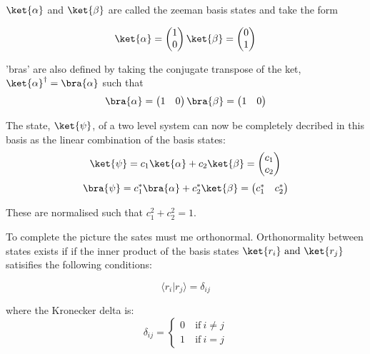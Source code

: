 $\ket{\alpha}$ and $\ket{\beta}$ are called the zeeman basis states and take the form

\begin{equation}
  \ket{\alpha} = \begin{pmatrix}
    1\\
    0
\end{pmatrix}
 \ket{\beta} = \begin{pmatrix}
   0\\
   1
\end{pmatrix}
\end{equation}

'bras' are also defined by taking the conjugate transpose of the ket, $\ket{\alpha}^{\dagger} =
\bra{\alpha}$ such that
\begin{equation}
  \bra{\alpha} = \begin{pmatrix}
    1 & 0
\end{pmatrix}
  \bra{\beta} = \begin{pmatrix}
  1 & 0
\end{pmatrix}
\end{equation}

The state, $\ket{\psi}$, of a two level system can now be completely decribed in this basis
as the linear combination of the basis states:
\begin{equation}\label{eqn:zeeman}
  \ket{\psi} = c_1\ket{\alpha} + c_2\ket{\beta} = \begin{pmatrix}
    c_1\\
    c_2
\end{pmatrix}
\end{equation}
\begin{equation}
  \bra{\psi} = c_1^*\bra{\alpha} + c_2^*\ket{\beta} = \begin{pmatrix}
    c_1^* & c_2^*
\end{pmatrix}
\end{equation}

These are normalised such that $c_1^2 + c_2^2 = 1$.

To complete the picture the sates must me orthonormal. Orthonormality between states exists if
if the inner product of the basis states $\ket{r_i} ~\text{and}~ \ket{r_j}$ satisifies the following conditions:

\begin{equation}
  \langle r_i\vert r_j\rangle = \delta_{ij}
\end{equation}

where the Kronecker delta is:
\begin{equation}
  \delta_{ij} = \begin{cases}
    0 & ~\text{if}~ i \ne j\\
    1 & ~\text{if}~ i = j
                \end{cases}
\end{equation}

